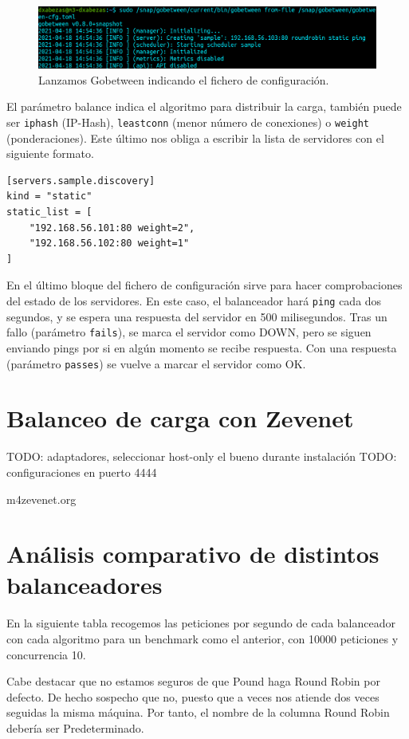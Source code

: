 \documentclass{article}
\begin{document}
\begin{figure}[H]
	\centering
	\includegraphics[width=160mm]{imgs/gobetween}
	\caption{Lanzamos Gobetween indicando el fichero de configuración.}
	\label{fig:gobetween}
\end{figure}

El parámetro balance indica el algoritmo para distribuir la carga, también puede ser \texttt{iphash} (IP-Hash),
\texttt{leastconn} (menor número de conexiones) o \texttt{weight} (ponderaciones). Este último nos obliga a escribir la
lista de servidores con el siguiente formato.
\begin{Verbatim}[tabsize=4]
[servers.sample.discovery]
kind = "static"
static_list = [
	"192.168.56.101:80 weight=2",
	"192.168.56.102:80 weight=1"
]
\end{Verbatim}

En el último bloque del fichero de configuración sirve para hacer comprobaciones del estado de los servidores.
En este caso, el balanceador hará \texttt{ping} cada dos segundos, y se espera una respuesta del servidor en 500
milisegundos. Tras un fallo (parámetro \texttt{fails}), se marca el servidor como DOWN, pero se siguen enviando pings
por si en algún momento se recibe respuesta. Con una respuesta (parámetro \texttt{passes}) se vuelve a marcar el
servidor como OK.

\section{Balanceo de carga con Zevenet}

TODO: adaptadores, seleccionar host-only el bueno durante instalación
TODO: configuraciones en puerto 4444

m4zevenet.org

\section{Análisis comparativo de distintos balanceadores}

En la siguiente tabla recogemos las peticiones por segundo de cada balanceador con cada algoritmo para un benchmark
como el anterior, con 10000 peticiones y concurrencia 10.

Cabe destacar que no estamos seguros de que Pound haga Round Robin por defecto. De hecho sospecho que no, puesto que
a veces nos atiende dos veces seguidas la misma máquina. Por tanto, el nombre de la columna Round Robin debería ser
Predeterminado.
\end{document}
